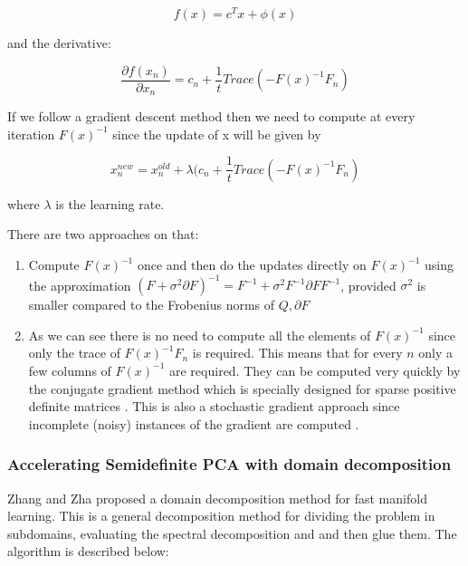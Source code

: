 \documentclass[12pt,letterpaper,doublespaced,ETD,dvips,proposal]{gtthesis}
\begin{document}
\begin{Body}
\begin{equation}
f(x)=c^Tx+\phi(x)
\end{equation}

and the derivative:

\begin{equation}
\frac{\partial f(x_n)}{\partial x_{n}} = c_n
+\frac{1}{t}Trace(-F(x)^{-1}F_n)
\end{equation}

If we follow a gradient descent method then we need to compute at
every iteration $F(x)^{-1}$ since the update of x will be given by

\begin{equation}
x_{n}^{new}=x_{n}^{old}+\lambda (c_n
+\frac{1}{t}Trace(-F(x)^{-1}F_n)
\end{equation}

where $\lambda$ is the learning rate.

There are two approaches on that:
\begin{enumerate}
  \item Compute $F(x)^{-1}$ once and then do the updates directly on
  $F(x)^{-1}$ using the approximation $(F+ \sigma^2\partial F)^{-1}
  = F^{-1} + \sigma^2 F^{-1}\partial F F^{-1}$, provided $\sigma^2$
  is smaller compared to the Frobenius norms of $Q, \partial F$
  \item As we can see there is no need to compute all the elements
  of $F(x)^{-1}$ since only the trace of $F(x)^{-1}F_n$ is required.
  This means that for every $n$ only a few columns of $F(x)^{-1}$
  are required. They can be computed very quickly by the conjugate
  gradient method \cite{saad2003ims} which is specially designed for sparse positive
  definite matrices \cite{saad2003ims}. This is also a stochastic gradient approach since
  incomplete (noisy) instances of the gradient are computed \cite{spall2003iss}.
\end{enumerate}

\subsubsection{Accelerating Semidefinite PCA with domain
decomposition}

Zhang and Zha  \cite{zhang:ddm} proposed a domain decomposition method for fast
manifold learning. This is a general decomposition method for
dividing the problem in subdomains, evaluating the spectral
decomposition and and then glue them. The algorithm is described
below:

\vspace{1cm}


\end{Body}
\end{document}
